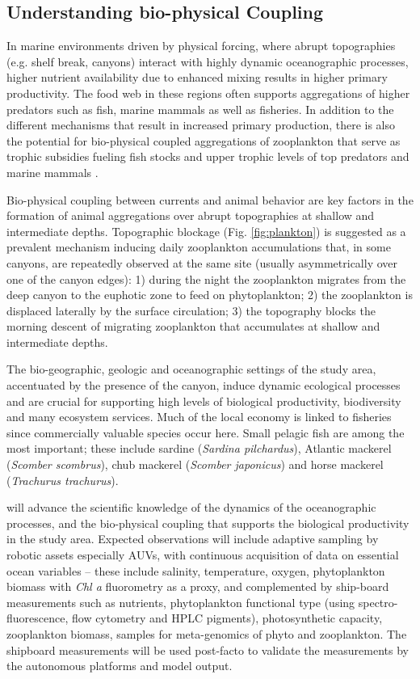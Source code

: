 \subsection{Understanding bio-physical Coupling}

In marine environments driven by physical forcing, where abrupt
topographies (e.g. shelf break, canyons) interact with highly dynamic
oceanographic processes, higher nutrient availability due to enhanced
mixing results in higher primary productivity.  The food web in these
regions often supports aggregations of higher predators such as fish,
marine mammals as well as fisheries. In addition to the different
mechanisms that result in increased primary production, there is also
the potential for bio-physical coupled aggregations of zooplankton
that serve as trophic subsidies fueling fish stocks and upper trophic
levels of top predators and marine mammals \cite{genin04}.

Bio-physical coupling between currents and animal behavior are key
factors in the formation of animal aggregations over abrupt
topographies at shallow and intermediate depths. Topographic blockage
(Fig. \ref{fig:plankton}) is suggested as a prevalent mechanism
inducing daily zooplankton accumulations that, in some canyons, are
repeatedly observed at the same site (usually asymmetrically over one
of the canyon edges): 1) during the night the zooplankton migrates
from the deep canyon to the euphotic zone to feed on phytoplankton; 2)
the zooplankton is displaced laterally by the surface circulation; 3)
the topography blocks the morning descent of migrating zooplankton
that accumulates at shallow and intermediate depths.

The bio-geographic, geologic and oceanographic settings of the study
area, accentuated by the presence of the \naz canyon, induce dynamic
ecological processes and are crucial for supporting high levels of
biological productivity, biodiversity and many ecosystem
services. Much of the local economy is linked to fisheries since
commercially valuable species occur here. Small pelagic fish are among
the most important; these include sardine (\emph{Sardina pilchardus}),
Atlantic mackerel (\emph{Scomber scombrus}), chub mackerel
(\emph{Scomber japonicus}) and horse mackerel (\emph{Trachurus
  trachurus}).

\proj will advance the scientific knowledge of the dynamics of the
oceanographic processes, and the bio-physical coupling that supports
the biological productivity in the study area. Expected observations
will include adaptive sampling by robotic assets especially AUVs, with
continuous acquisition of data on essential ocean variables -- these
include salinity, temperature, oxygen, phytoplankton biomass with
\emph{Chl a} fluorometry as a proxy, and complemented by ship-board
measurements such as nutrients, phytoplankton functional type (using
spectro-fluorescence, flow cytometry and HPLC pigments), photosynthetic
capacity, zooplankton biomass, samples for meta-genomics of phyto and
zooplankton.  The shipboard measurements will be used post-facto to
validate the measurements by the autonomous platforms and model
output.

